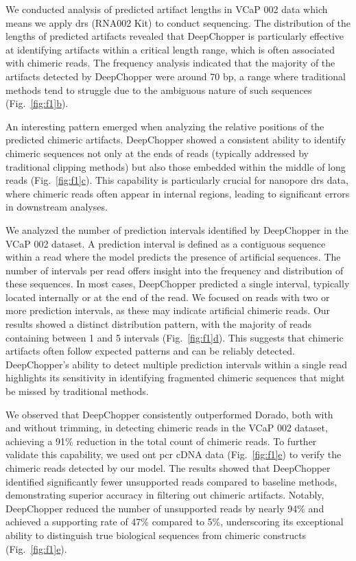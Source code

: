 \documentclass[pdflatex, sn-mathphys-num, lineno]{sn-jnl}%
\newcommand{\figref}[2]{Fig.~\hyperref[#1]{\ref*{#1}#2}}
\theoremstyle{thmstyleone}%
\theoremstyle{thmstyletwo}%
\theoremstyle{thmstylethree}%
\begin{document}
We conducted analysis of predicted artifact lengths in VCaP 002 data which means we apply \gls{drs} (RNA002 Kit) to conduct sequencing.
The distribution of the lengths of predicted artifacts revealed that DeepChopper is particularly effective at identifying artifacts within a critical length range, which is often associated with chimeric reads.
The frequency analysis indicated that the majority of the artifacts detected by DeepChopper were around 70 bp, a range where traditional methods tend to struggle due to the ambiguous nature of such sequences (\figref{fig:f1}{b}).

An interesting pattern emerged when analyzing the relative positions of the predicted chimeric artifacts.
DeepChopper showed a consistent ability to identify chimeric sequences not only at the ends of reads (typically addressed by traditional clipping methods) but also those embedded within the middle of long reads (\figref{fig:f1}{c}).
This capability is particularly crucial for nanopore \gls{drs} data, where chimeric reads often appear in internal regions, leading to significant errors in downstream analyses.

We analyzed the number of prediction intervals identified by DeepChopper in the VCaP 002 dataset.
A prediction interval is defined as a contiguous sequence within a read where the model predicts the presence of artificial sequences.
The number of intervals per read offers insight into the frequency and distribution of these sequences.
In most cases, DeepChopper predicted a single interval, typically located internally or at the end of the read.
We focused on reads with two or more prediction intervals, as these may indicate artificial chimeric reads.
Our results showed a distinct distribution pattern, with the majority of reads containing between 1 and 5 intervals (\figref{fig:f1}{d}).
This suggests that chimeric artifacts often follow expected patterns and can be reliably detected.
DeepChopper's ability to detect multiple prediction intervals within a single read highlights its sensitivity in identifying fragmented chimeric sequences that might be missed by traditional methods.


We observed that DeepChopper consistently outperformed Dorado, both with and without trimming, in detecting chimeric reads in the VCaP 002 dataset, achieving a 91\% reduction in the total count of chimeric reads.
To further validate this capability, we used \gls{ont} \gls{pcr} cDNA data (\figref{fig:f1}{e}) to verify the chimeric reads detected by our model.
The results showed that DeepChopper identified significantly fewer unsupported reads compared to baseline methods, demonstrating superior accuracy in filtering out chimeric artifacts.
Notably, DeepChopper reduced the number of unsupported reads by nearly 94\% and achieved a supporting rate of 47\% compared to 5\%, underscoring its exceptional ability to distinguish true biological sequences from chimeric constructs (\figref{fig:f1}{e}).
\end{document}
